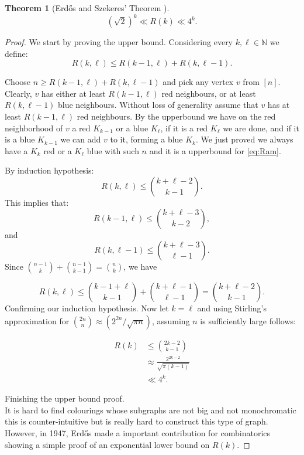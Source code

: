 \documentclass[12pt,twoside,a4paper]{book}
\numberwithin{equation}{section}
\newtheorem{theorem}             {Theorem}[section]
\theoremstyle{remark}
\begin{document}
\begin{theorem}[{Erd\H{o}s and Szekeres' Theorem \cite{ersz35, Er47}}]\label{thm:ErdosandS}
$$(\sqrt{2})^k \ll R(k) \ll 4^k.$$
\end{theorem}
\begin{proof} We start by proving the upper bound. Considering every $k, \ell \in \mathbb{N}$ we define:\\
\begin{equation}\label{eq:Ram}
R(k,\ell ) \leq R(k-1,\ell )+R(k,\ell-1).
\end{equation}

Choose $n \geq R(k-1,\ell) + R(k, \ell-1)$ and pick any vertex $v$ from $[n]$. Clearly, $v$ has either at least $R(k-1,\ell)$ red neighbours, or at least $R(k,\ell-1)$ blue neighbours. Without loss of generality assume that $v$ has at least $R(k-1,\ell)$ red neighbours. By the upperbound we have on the red neighborhood of $v$ a red $K_{k-1}$ or a blue $K_{\ell}$, if it is a red $K_{\ell}$ we are done, and if it is a blue $K_{k-1}$ we can add $v$ to it, forming a blue $K_k$. We just proved we always have a $K_k$ red or a $K_{\ell}$ blue with such $n$ and it is a upperbound for \ref{eq:Ram}.

By induction hypothesis:
$$R(k,\ell) \leq \binom{k+\ell - 2}{k - 1}.$$
This implies that:
$$R(k-1,\ell)\leq \binom{k+\ell -3}{k-2},$$ and $$R(k,\ell-1)\leq \binom{k+\ell-3}{\ell-1}.$$
Since $\binom{n-1}{k} + \binom{n-1}{k-1} = \binom{n}{k}$, we have

$$R(k,\ell)\leq \binom{k-1+\ell}{k-1} + \binom{k+\ell-1}{\ell-1} = \binom{k+ \ell -2}{k-1}.$$
Confirming our induction hypothesis. Now let $k = \ell$ and using Stirling's approximation for $\binom{2n}{n} \approx (2^{2n}/\sqrt{\pi n})$, assuming $n$ is sufficiently large follows:

\begin{align*}
R(k) &\leq \binom{2k -2}{k-1}\\
& \approx \frac{2^{2k-2}}{\sqrt{\pi (k-1)}}\\
& \ll 4^k.
\end{align*}

Finishing the upper bound proof.\\

It is hard to find colourings whose subgraphs are not big and not monochromatic this is counter-intuitive but is really hard to construct this type of graph. However, in 1947, Erd\H{o}s made a important contribution for combinatorics showing a simple proof of an exponential lower bound on $R(k)$.


\end{proof}
\end{document}
